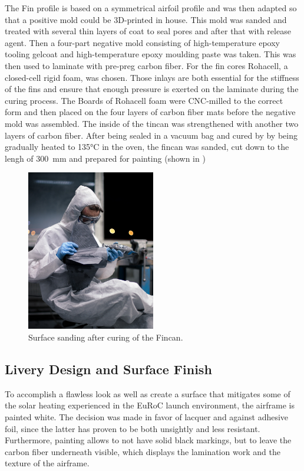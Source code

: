 The Fin profile is based on a symmetrical airfoil profile and was then adapted so that a positive mold could be 3D-printed in house. This mold was sanded and treated with several thin layers of coat to seal pores and after that with release agent. Then a four-part negative mold consisting of high-temperature epoxy tooling gelcoat and high-temperature epoxy moulding paste was taken. This was then used to laminate with pre-preg carbon fiber. For the fin cores Rohacell, a closed-cell rigid foam, was chosen. Those inlays are both essential for the stiffness of the fins and ensure that enough pressure is exerted on the laminate during the curing process. The Boards of Rohacell foam were CNC-milled to the correct form and then placed on the four layers of carbon fiber mats before the negative mold was assembled. The inside of the tincan was strengthened with another two layers of carbon fiber. After being sealed in a vacuum bag and cured by by being gradually heated to 135°C in the oven, the fincan was sanded, cut down to the lengh of \SI{300}{\milli\meter} and prepared for painting (shown in )

\begin{figure} [H]
\centering
\includegraphics[width=0.5\textwidth]{Aerostructure/Fincan-3.jpg}
\caption{Surface sanding after curing of the Fincan.}
\label{fig:aerostructure_fincan}
\end{figure}

\subsection{Livery Design and Surface Finish}
To accomplish a flawless look as well as create a surface that mitigates some of the solar heating experienced in the EuRoC launch environment, the airframe is painted white. The decision was made in favor of lacquer and against adhesive foil, since the latter has proven to be both unsightly and less resistant. Furthermore, painting allows to not have solid black markings, but to leave the carbon fiber underneath visible, which displays the lamination work and the texture of the airframe.

